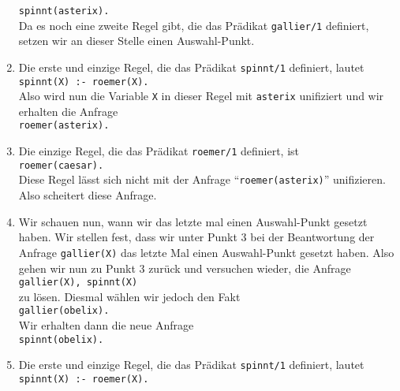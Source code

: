 \begin{enumerate}
      \texttt{spinnt(asterix).} \\[0.2cm]
      Da es noch eine zweite Regel gibt, die das Pr\"{a}dikat \texttt{gallier/1} definiert,
      setzen wir an dieser Stelle einen Auswahl-Punkt.   
\item Die erste und einzige Regel, die das Pr\"{a}dikat \texttt{spinnt/1} definiert,
      lautet \\[0.2cm]
      \hspace*{1.3cm} 
      \texttt{spinnt(X) :- roemer(X).} \\[0.2cm]
      Also wird nun die Variable \texttt{X} in dieser Regel mit \texttt{asterix} 
      unifiziert und wir erhalten die Anfrage \\[0.2cm]
      \hspace*{1.3cm} 
      \texttt{roemer(asterix).}
\item Die einzige Regel, die das Pr\"{a}dikat \texttt{roemer/1} definiert, ist \\[0.2cm]
      \hspace*{1.3cm} 
      \texttt{roemer(caesar).} \\[0.2cm]
      Diese Regel l\"{a}sst sich nicht mit der Anfrage ``\texttt{roemer(asterix)}'' unifizieren.
      Also scheitert diese Anfrage.
\item Wir schauen nun, wann wir das letzte mal einen Auswahl-Punkt gesetzt haben.
      Wir stellen fest, dass wir unter Punkt 3 bei der Beantwortung der Anfrage
      \texttt{gallier(X)} das letzte Mal einen Auswahl-Punkt gesetzt haben.
      Also gehen wir nun zu Punkt 3 zur\"{u}ck und versuchen wieder, die Anfrage
      \\[0.2cm]
      \hspace*{1.3cm} 
      \texttt{gallier(X), spinnt(X)} \\[0.2cm]
      zu l\"{o}sen.  Diesmal w\"{a}hlen wir jedoch den Fakt \\[0.2cm]
      \hspace*{1.3cm} \texttt{gallier(obelix).}  \\[0.2cm]
      Wir erhalten dann die neue Anfrage \\[0.2cm]
      \hspace*{1.3cm} \texttt{spinnt(obelix).}
\item Die erste und einzige Regel, die das Pr\"{a}dikat \texttt{spinnt/1} definiert,
      lautet \\[0.2cm]
      \hspace*{1.3cm} 
      \texttt{spinnt(X) :- roemer(X).} \\[0.2cm]

\end{enumerate}
